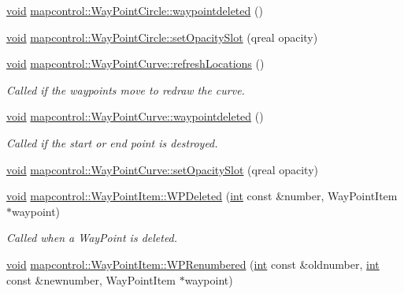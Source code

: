 \begin{DoxyCompactItemize}
\item 
\hyperlink{group___u_a_v_objects_plugin_ga444cf2ff3f0ecbe028adce838d373f5c}{void} \hyperlink{group___o_p_map_widget_ga25a712ca0ed34f0163763e1244f9cee8}{mapcontrol\-::\-Way\-Point\-Circle\-::waypointdeleted} ()
\item 
\hyperlink{group___u_a_v_objects_plugin_ga444cf2ff3f0ecbe028adce838d373f5c}{void} \hyperlink{group___o_p_map_widget_ga4dcdc126c105f68278a330efd6e8e590}{mapcontrol\-::\-Way\-Point\-Circle\-::set\-Opacity\-Slot} (qreal opacity)
\item 
\hyperlink{group___u_a_v_objects_plugin_ga444cf2ff3f0ecbe028adce838d373f5c}{void} \hyperlink{group___o_p_map_widget_ga5ce80f636cc1414d154b751de3a0f6f3}{mapcontrol\-::\-Way\-Point\-Curve\-::refresh\-Locations} ()
\begin{DoxyCompactList}\small\item\em Called if the waypoints move to redraw the curve. \end{DoxyCompactList}\item 
\hyperlink{group___u_a_v_objects_plugin_ga444cf2ff3f0ecbe028adce838d373f5c}{void} \hyperlink{group___o_p_map_widget_gad0bb9ce622beb314a984fa559fb1d894}{mapcontrol\-::\-Way\-Point\-Curve\-::waypointdeleted} ()
\begin{DoxyCompactList}\small\item\em Called if the start or end point is destroyed. \end{DoxyCompactList}\item 
\hyperlink{group___u_a_v_objects_plugin_ga444cf2ff3f0ecbe028adce838d373f5c}{void} \hyperlink{group___o_p_map_widget_ga61d082b265428ef62b08b8faf2fa8ec0}{mapcontrol\-::\-Way\-Point\-Curve\-::set\-Opacity\-Slot} (qreal opacity)
\item 
\hyperlink{group___u_a_v_objects_plugin_ga444cf2ff3f0ecbe028adce838d373f5c}{void} \hyperlink{group___o_p_map_widget_ga4f73652bac019e1b92fc67c4a2403b2b}{mapcontrol\-::\-Way\-Point\-Item\-::\-W\-P\-Deleted} (\hyperlink{ioapi_8h_a787fa3cf048117ba7123753c1e74fcd6}{int} const \&number, Way\-Point\-Item $\ast$waypoint)
\begin{DoxyCompactList}\small\item\em Called when a Way\-Point is deleted. \end{DoxyCompactList}\item 
\hyperlink{group___u_a_v_objects_plugin_ga444cf2ff3f0ecbe028adce838d373f5c}{void} \hyperlink{group___o_p_map_widget_ga071a506384379c4aabb30ea5dc0fa4e1}{mapcontrol\-::\-Way\-Point\-Item\-::\-W\-P\-Renumbered} (\hyperlink{ioapi_8h_a787fa3cf048117ba7123753c1e74fcd6}{int} const \&oldnumber, \hyperlink{ioapi_8h_a787fa3cf048117ba7123753c1e74fcd6}{int} const \&newnumber, Way\-Point\-Item $\ast$waypoint)

\end{DoxyCompactItemize}
